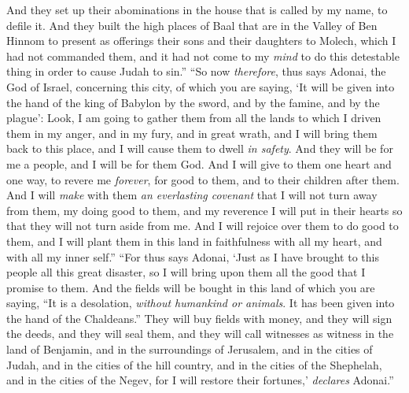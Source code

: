 \begin{biblechapter}
\verse And they set up their abominations in the house that is called by my name, to defile it.
\verse And they built the high places of Baal that are in the Valley of Ben Hinnom to present as offerings their sons and their daughters to Molech, which I had not commanded them, and it had not come to my \textit{mind} to do this detestable thing in order to cause Judah to sin.”
\verse “So now \textit{therefore}, thus says Adonai, the God of Israel, concerning this city, of which you are saying, ‘It will be given into the hand of the king of Babylon by the sword, and by the famine, and by the plague’:
\verse Look, I am going to gather them from all the lands to which I driven them in my anger, and in my fury, and in great wrath, and I will bring them back to this place, and I will cause them to dwell \textit{in safety}.
\verse And they will be for me a people, and I will be for them God.
\verse And I will give to them one heart and one way, to revere me \textit{forever}, for good to them, and to their children after them.
\verse And I will \textit{make} with them \textit{an everlasting covenant} that I will not turn away from them, my doing good to them, and my reverence I will put in their hearts so that they will not turn aside from me.
\verse And I will rejoice over them to do good to them, and I will plant them in this land in faithfulness with all my heart, and with all my inner self.”
\verse “For thus says Adonai, ‘Just as I have brought to this people all this great disaster, so I will bring upon them all the good that I promise to them.
\verse And the fields will be bought in this land of which you are saying, “It is a desolation, \textit{without humankind or animals}. It has been given into the hand of the Chaldeans.”
\verse They will buy fields with money, and they will sign the deeds, and they will seal them, and they will call witnesses as witness in the land of Benjamin, and in the surroundings of Jerusalem, and in the cities of Judah, and in the cities of the hill country, and in the cities of the Shephelah, and in the cities of the Negev, for I will restore their fortunes,’ \textit{declares} Adonai.”
\end{biblechapter}

